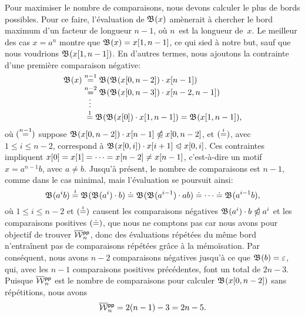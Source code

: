 
Pour maximiser le nombre de comparaisons, nous
devons calculer le plus de bords possibles. Pour ce faire,
l'évaluation de \(\mathfrak{B}^{}(x)\) amènerait à chercher le bord maximum
d'un facteur de longueur \(n-1\), où \(n\)~est la longueur
de~\(x\). Le meilleur des cas \(x=a^{n}\) montre que \(\mathfrak{B}^{}(x) =
{x}[{1,n-1}]\), ce qui sied à notre but, sauf que nous voudrions
\(\mathfrak{B}^{}({x}[{1,n-1}])\). En d'autres termes, nous ajoutons la
contrainte d'une première comparaison négative:
\begin{align*}
\mathfrak{B}^{}(x)
&\mathrel{\stackrel{\smash{n-1}}{=}} \mathfrak{B}^{}(\mathfrak{B}^{}({x}[{0,n-2}]) \cdot {x}[{n-1}])\\
&\mathrel{\stackrel{\smash{n-2}}{=}} \mathfrak{B}^{}(\mathfrak{B}^{}({x}[{0,n-3}]) \cdot {x}[{n-2,n-1}])\\
&\;\;\;\smash{\vdots}\\
&\;\mathrel{\stackrel{\smash[t]{1}}{=}}
  \mathfrak{B}^{}(\mathfrak{B}^{}({x}[{0}]) \cdot {x}[{1,n-1}])
= \mathfrak{B}^{}({x}[{1,n-1}]),
\end{align*}
où \((\smash{\mathrel{\stackrel{\smash{n-1}}{=}}})\) suppose \(\mathfrak{B}^{}({x}[{0,n-2}]) \cdot
{x}[{n-1}] \mathrel{\ntrianglelefteqslant} {x}[{0,n-2}]\), et \((\smash{\mathrel{\stackrel{\smash{i}}{=}}})\), avec
\(1 \leqslant i \leqslant n-2\), correspond à
\(\mathfrak{B}^{}({x}[{0,i}]) \cdot {x}[{i+1}] \mathrel{\trianglelefteqslant}
{x}[{0,i}]\). Ces contraintes impliquent \({x}[{0}] = {x}[{1}] =
\dots = {x}[{n-2}] \neq {x}[{n-1}]\), c'est-à-dire un motif
\(x=a^{n-1}b\), avec \(a \neq b\). Jusqu'à présent, le nombre de
comparaisons est \(n-1\), comme dans le cas minimal, mais l'évaluation
se poursuit ainsi:
\begin{equation*}
\mathfrak{B}^{}(a^{i}b)
\mathrel{\stackrel{\smash{i}}{=}} \mathfrak{B}^{}(\mathfrak{B}^{}(a^{i}) \cdot b)\\
\doteq \mathfrak{B}^{}(\mathfrak{B}^{}(a^{i-1}) \cdot ab)\\
\doteq \dots \doteq \mathfrak{B}^{}(a^{i-1}b),
\end{equation*}
où \(1 \leqslant i \leqslant n-2\) et \((\smash{\mathrel{\stackrel{\smash{i}}{=}}})\) causent
les comparaisons négatives \({\mathfrak{B}^{}(a^{i}) \cdot b \mathrel{\ntrianglelefteqslant} a^{i}}\)
et les comparaisons positives \((\smash{\doteq})\), que nous ne
comptons pas car nous avons pour objectif de trouver
\(\OW{\fun{pp}}{n}\), donc des
évaluations répétées du même bord n'entraînent pas de comparaisons
répétées grâce à la mémoïsation. Par conséquent,
nous avons \(n-2\) comparaisons négatives jusqu'à ce que
\(\mathfrak{B}^{}(b) = \varepsilon\), qui, avec les \(n-1\) comparaisons
positives précédentes, font un total de \(2n-3\). Puisque
\(\OW{\fun{pp}}{n}\) est le nombre de comparaisons pour calculer
\(\mathfrak{B}^{}({x}[{0,n-2}])\) sans répétitions, nous avons
\begin{equation*}
\belowdisplayskip=0pt
\OW{\fun{pp}}{n} = 2(n-1)-3 = 2n - 5.
\end{equation*}

